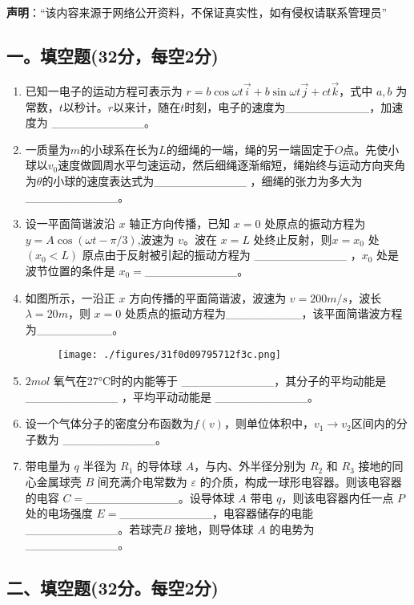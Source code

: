
\textbf{声明}：“该内容来源于网络公开资料，不保证真实性，如有侵权请联系管理员”

\subsection{一。填空题(32分，每空2分)}
\begin{enumerate}
    \item 已知一电子的运动方程可表示为 $r = b \cos \omega t\vec{i} + b \sin \omega t\vec{j} + ct\vec{k}$，式中 $a,b$ 为常数，$t$以秒计。$r$以来计，随在$t$时刻，电子的速度为__________，加速度为 ___________。
    \item 一质量为$m$的小球系在长为$L$的细绳的一端，绳的另一端固定于$O$点。先使小球以$v_0$速度做圆周水平匀速运动，然后细绳逐渐缩短，绳始终与运动方向夹角为$\theta$的小球的速度表达式为___________ ，细绳的张力为多大为 ___________。
    \item 设一平面简谐波沿 $x$ 轴正方向传播，已知 $x=0$ 处原点的振动方程为$ y = A \cos(\omega t - \pi/3)$,波速为 $v$。波在 $x=L$ 处终止反射，则$x=x_0$ 处 $(x_0 < L)$ 原点由于反射被引起的振动方程为 ___________ ，$x_0$ 处是波节位置的条件是 $x_0 =$___________。
    \item 如图所示，一沿正 $x$ 方向传播的平面简谐波，波速为 $v = 200 m/s$，波长 $\lambda = 20 m$，则 $x = 0$ 处质点的振动方程为_________，该平面简谐波方程为_________。
\begin{figure}[ht]
\centering
\texttt{[image: ./figures/31f0d09795712f3c.png]}
\caption{} \label{fig_NJU10_1}
\end{figure}
    \item $2 mol$ 氧气在27°C时的内能等于 ___________，其分子的平均动能是 ___________ ，平均平动动能是 ___________。
    \item 设一个气体分子的密度分布函数为$f(v)$，则单位体积中，$v_1\to v_2$区间内的分子数为 ___________。
    \item 带电量为 $q$ 半径为 $R_1$ 的导体球 $A$，与内、外半径分别为 $R_2$ 和 $R_3$ 接地的同心金属球壳 $B$ 间充满介电常数为 $\varepsilon$ 的介质，构成一球形电容器。则该电容器的电容 $C=$___________。设导体球 $A$ 带电 $q$，则该电容器内任一点 $P$ 处的电场强度 $E=$___________，电容器储存的电能___________。若球壳$B$ 接地，则导体球 $A$ 的电势为 ___________。
\end{enumerate}
\subsection{二、填空题(32分。每空2分)}
